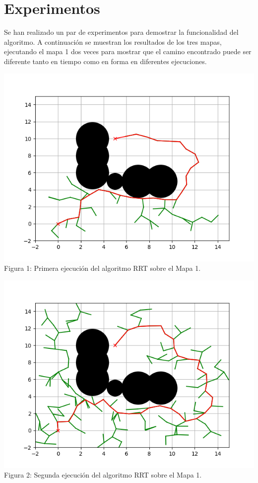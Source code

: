 \documentclass[14pt]{extarticle}
\theoremstyle{definition}
\theoremstyle{remark}
\begin{document}
\section{Experimentos}\label{sec:experimentos}
Se han realizado un par de experimentos para demostrar la funcionalidad del algoritmo. A continuación se muestran los resultados de los tres mapas, ejecutando el mapa 1 dos veces para mostrar que el camino encontrado puede ser diferente tanto en tiempo como en forma en diferentes ejecuciones.

\begin{center}
    \includegraphics[scale=0.7]{Map1_1.png}
    \\Figura 1: Primera ejecución del algoritmo RRT sobre el Mapa 1.
\end{center}

\begin{center}
    \includegraphics[scale=0.7]{Map1_2.png}
    \\Figura 2: Segunda ejecución del algoritmo RRT sobre el Mapa 1.
\end{center}
\end{document}
